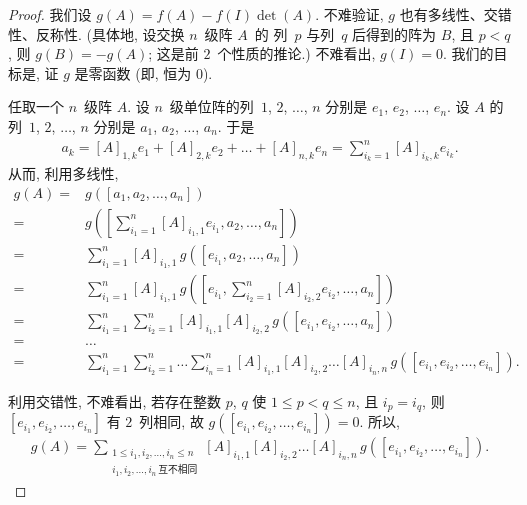 \documentclass[../libro.tex]{subfiles}
\begin{document}
\begin{proof}
    我们设 \(g(A) = f(A) - f(I) \det {(A)}\).
    不难验证, \(g\) 也有多线性、交错性、反称性.
    (具体地, 设交换 \(n\)~级阵 \(A\)~的%
    列~\(p\) 与列~\(q\) 后得到的阵为 \(B\),
    且 \(p < q\),
    则 \(g(B) = -g(A)\);
    这是前 \(2\)~个性质的推论.) %
    不难看出, \(g(I) = 0\).
    我们的目标是, 证 \(g\) 是零函数 (即, 恒为 \(0\)).

    任取一个 \(n\)~级阵 \(A\).
    设 \(n\)~级单位阵的列~\(1\), \(2\), \(\dots\), \(n\)
    分别是 \(e_1\), \(e_2\), \(\dots\), \(e_n\).
    设 \(A\) 的列~\(1\), \(2\), \(\dots\), \(n\)
    分别是 \(a_1\), \(a_2\), \(\dots\), \(a_n\).
    于是
    \begin{align*}
        a_{k}
        = [A]_{1,k} e_{1} + [A]_{2,k} e_{2} + \dots + [A]_{n,k} e_{n}
        = \sum_{i_k = 1}^{n} {[A]_{i_k,k} e_{i_k}}.
    \end{align*}
    从而, 利用多线性,
    \begin{align*}
        g(A)
        = {} &
        g([a_1, a_2, \dots, a_n])
        \\
        = {} &
        g\left(\left[ \sum_{i_1 = 1}^{n} {[A]_{i_1,1} e_{i_1},
        a_2, \dots, a_n} \right]\right)
        \\
        = {} &
        \sum_{i_1 = 1}^{n} {[A]_{i_1,1}\,
        g([ e_{i_1}, a_2, \dots, a_n ])}
        \\
        = {} &
        \sum_{i_1 = 1}^{n} {[A]_{i_1,1}\,
            g\left(\left[ e_{i_1},
                    \sum_{i_2 = 1}^{n} [A]_{i_2,2} e_{i_2},
                    \dots, a_n
        \right]\right)}
        \\
        = {} &
        \sum_{i_1 = 1}^{n} {
            \sum_{i_2 = 1}^{n} {[A]_{i_1,1} [A]_{i_2,2}\,
        g([ e_{i_1}, e_{i_2}, \dots, a_n ])}}
        \\
        = {} &
        \dots
        \\
        = {} &
        \sum_{i_1 = 1}^{n} {
            \sum_{i_2 = 1}^{n} {
                \dots
                \sum_{i_n = 1}^{n} {
                    [A]_{i_1,1} [A]_{i_2,2} \dots [A]_{i_n,n} \,
        g([e_{i_1}, e_{i_2}, \dots, e_{i_n}])}}}.
    \end{align*}

    利用交错性, 不难看出,
    若存在整数 \(p\), \(q\)
    使 \(1 \leq p < q \leq n\),
    且 \(i_p = i_q\),
    则 \([e_{i_1}, e_{i_2}, \dots, e_{i_n}]\)
    有 \(2\)~列相同,
    故 \(g([e_{i_1}, e_{i_2}, \dots, e_{i_n}]) = 0\).
    所以,
    \begin{align*}
        g(A)
        = \sum_{\substack{
                1 \leq i_1, i_2, \dots, i_n \leq n \\
                i_1, i_2, \dots, i_n\,\text{互不相同}
        }}
        {[A]_{i_1,1} [A]_{i_2,2} \dots [A]_{i_n,n}\,
        g([e_{i_1}, e_{i_2}, \dots, e_{i_n}])}.
    \end{align*}


\end{proof}
\end{document}
